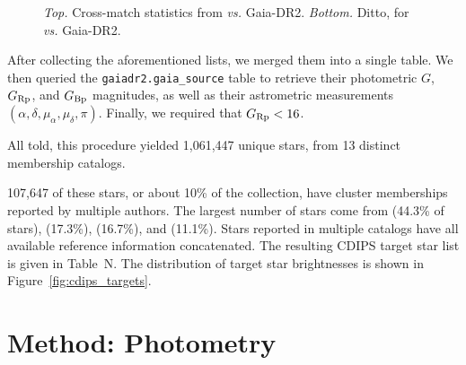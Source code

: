\documentclass[12pt,twocolumn,tighten]{aastex62}
\begin{document}
\begin{figure}[!ht]
	\vspace{-0.8cm}
	\caption{
		{\it Top.} Cross-match statistics from \cite{Kharchenko_et_al_2013} {\it 
			vs.} Gaia-DR2.
		{\it Bottom.} Ditto, for \cite{dias_proper_2014} {\it vs.} Gaia-DR2.
	}
	\label{fig:xmatch_info}
\end{figure}


After collecting the aforementioned lists, we
merged them into a single table. We then queried the
\texttt{gaiadr2.gaia\_source} table to retrieve their photometric $G$,
$G_{\rm Rp}$, and $G_{\rm Bp}$ magnitudes, as well as their
astrometric measurements $(\alpha, \delta, \mu_\alpha, \mu_\delta,
\pi)$.  Finally, we required that $G_{\rm Rp} < 16$.  

All told, this procedure yielded 1{,}061{,}447 unique stars, from 13 distinct
membership catalogs.

107{,}647 of these stars, or about
10\% of the collection, have cluster memberships reported by
multiple authors.  The largest number of stars come from
\citealt{dias_proper_2014} (44.3\% of stars), \citealt{Kharchenko_et_al_2013}
(17.3\%), \citealt{cantat-gaudin_gaia_2018} (16.7\%), and \citealt{zari_3d_2018}
(11.1\%).
Stars reported in multiple catalogs have all available reference information
concatenated.  
The resulting CDIPS target star list is given in Table~N.
The distribution of target star brightnesses is shown in
Figure~\ref{fig:cdips_targets}.





\section{Method: Photometry}
\label{sec:method}
\end{document}
